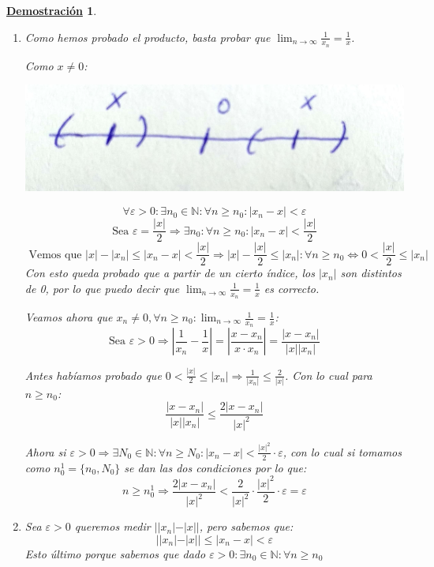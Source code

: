 \documentclass[10pt,a4paper,openright]{book}
\theoremstyle{break}
\newtheorem*{demo}{\underline{Demostración}}
\begin{document}
\begin{demo}
\begin{enumerate}
\item Como hemos probado el producto, basta probar que $\lim_{n\rightarrow \infty} \frac{1}{x_n}=\frac{1}{x}$.\par
Como $x\neq 0$:

\begin{center}
\includegraphics[scale=0.05]{x a cero}
\end{center}

$$\forall \varepsilon>0: \exists n_0\in \mathbb N: \forall n\geq n_0: |x_n-x|<\varepsilon$$
$$\mbox{Sea }\varepsilon=\frac{|x|}{2}\Rightarrow \exists n_0: \forall n\geq n_0: |x_n-x|<\frac{|x|}{2}$$
$$\mbox{ Vemos que } |x|-|x_n|\leq |x_n-x|<\frac{|x|}{2}\Rightarrow |x|-\frac{|x|}{2}\leq |x_n|: \forall n\geq n_0\Leftrightarrow 0< \frac{|x|}{2}\leq |x_n|$$
Con esto queda probado que a partir de un cierto índice, los $|x_n|$ son distintos de 0, por lo que puedo decir que $\lim_{n\rightarrow \infty} \frac{1}{x_n}=\frac{1}{x}$ es correcto.\par

Veamos ahora que $x_n\neq 0, \forall n\geq n_0: \lim_{n\rightarrow \infty}\frac{1}{x_n}=\frac{1}{x}$:
$$\mbox{Sea }\varepsilon>0\Rightarrow |\frac{1}{x_n}-\frac{1}{x}|=|\frac{x-x_n}{x\cdot x_n}|=\frac{|x-x_n|}{|x||x_n|}$$

Antes habíamos probado que $0< \frac{|x|}{2}\leq |x_n|\Rightarrow \frac{1}{|x_n|}\leq \frac{2}{|x|}$. Con lo cual para $n\geq n_0$:
$$\frac{|x-x_n|}{|x||x_n|}\leq \frac{2|x-x_n|}{|x|^2}$$

Ahora si $\varepsilon>0\Rightarrow \exists N_0\in \mathbb N: \forall n\geq N_0: |x_n-x|< \frac{|x|^2}{2}\cdot \varepsilon$, con lo cual si tomamos como $n_0^1=\{n_0,N_0\}$ se dan las dos condiciones por lo que:
	$$n\geq n_0^1\Rightarrow \frac{2|x-x_n|}{|x|^2}< \frac{2}{|x|^2}\cdot \frac{|x|^2}{2}\cdot \varepsilon=\varepsilon$$

\vspace{0.40cm}

\item Sea $\varepsilon>0$ queremos medir $||x_n|-|x||$, pero sabemos que:
$$||x_n|-|x||\leq |x_n-x|<\varepsilon$$
Esto último porque sabemos que dado $\varepsilon>0 : \exists n_0\in \mathbb N: \forall n\geq n_0$
\end{enumerate}
\end{demo}
\end{document}
